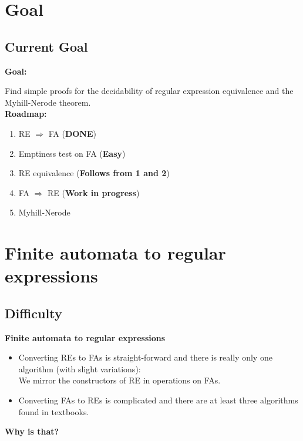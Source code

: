 \documentclass{beamer}
\begin{document}
\section{Goal}
\subsection*{Current Goal}
\begin{frame}

    \textbf{Goal:}

    Find simple proofs for the decidability of regular expression equivalence and the Myhill-Nerode theorem.\\

    \textbf{Roadmap:}

    \begin{enumerate}
        \item RE $\Rightarrow$ FA (\textbf{DONE})
        \item Emptiness test on FA (\textbf{Easy})
        \item RE equivalence (\textbf{Follows from 1 and 2})
        \item FA $\Rightarrow$ RE (\textbf{Work in progress})
        \item Myhill-Nerode
    \end{enumerate}

\end{frame}

\section*{Finite automata to regular expressions}
\subsection*{Difficulty}
\begin{frame}

    \large{\textbf{Finite automata to regular expressions}}

    \begin{itemize}
        \item
            Converting REs to FAs is straight-forward and there is really only one algorithm (with slight variations): \\
            We mirror the constructors of RE in operations on FAs.

            \pause

        \item
            Converting FAs to REs is complicated and there are at least three algorithms found in textbooks.
    \end{itemize}

    \pause

    {\centering 
        \textbf{Why is that?}

    }

\end{frame}
\end{document}
